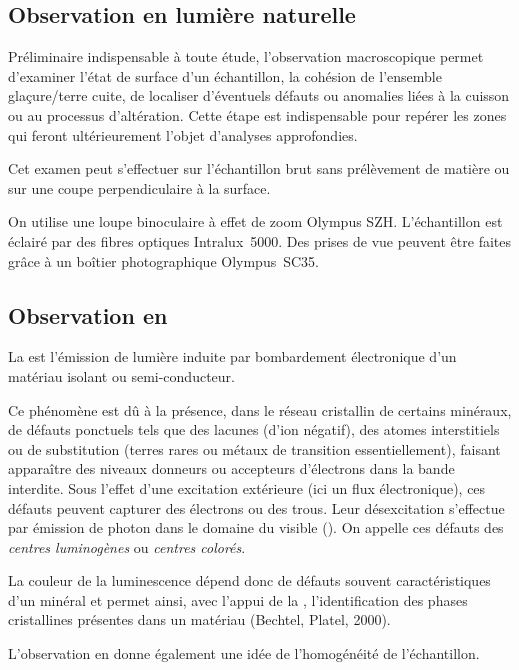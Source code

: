 \subsection{Observation en lumière naturelle}
Préliminaire indispensable à toute étude, l'observation macroscopique 
permet d'examiner l'état de surface d'un échantillon, la cohésion de 
l'ensemble glaçure/terre cuite, de localiser d'éventuels défauts ou 
anomalies liées à la cuisson ou au processus d'altération. Cette étape 
est indispensable pour repérer les zones qui feront ultérieurement 
l'objet d'analyses approfondies.

Cet examen peut s'effectuer sur l'échantillon brut sans prélèvement 
de matière ou sur une coupe perpendiculaire à la surface.

On utilise une loupe binoculaire à effet de zoom Olympus SZH. 
L'échantillon est éclairé par des fibres optiques Intralux~5000. 
Des prises de vue peuvent être faites grâce à un boîtier 
photographique Olympus~SC35.

\subsection{Observation en \CL}
La \CL est l'émission de lumière induite par bombardement électronique 
d'un matériau isolant ou semi-conducteur.

Ce phénomène est dû à la présence, dans le réseau cristallin de 
certains minéraux, de défauts ponctuels tels que des lacunes (d'ion 
négatif), des atomes interstitiels ou de substitution (terres rares 
ou métaux de transition essentiellement), faisant apparaître des 
niveaux donneurs ou accepteurs d'électrons dans la bande interdite. 
Sous l'effet d'une excitation extérieure (ici un flux électronique), 
ces défauts peuvent capturer des électrons ou des trous. Leur 
désexcitation s'effectue par émission de photon dans le domaine 
du visible (). On appelle ces défauts des 
\emph{centres luminogènes} ou \emph{centres colorés}.

La couleur de la luminescence dépend donc de défauts souvent caractéristiques d'un minéral et permet ainsi, avec l'appui de la \DX, l'identification des phases cristallines présentes dans un matériau (Bechtel, Platel, 2000).

L'observation en \CL donne également une idée de l'homogénéité de 
l'échantillon.

